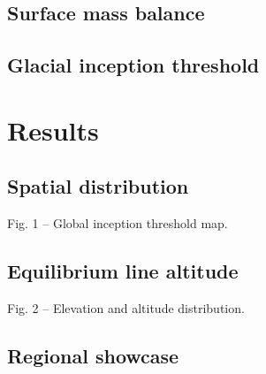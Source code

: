 \documentclass[manuscript]{copernicus}
\begin{document}
\subsection{Surface mass balance}

\subsection{Glacial inception threshold}

\section{Results}

\subsection{Spatial distribution}

    Fig. 1 -- Global inception threshold map.


\subsection{Equilibrium line altitude}

    Fig. 2 -- Elevation and altitude distribution.

\subsection{Regional showcase}
\end{document}
